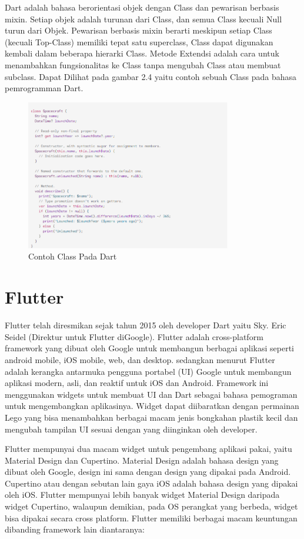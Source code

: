 \begin{enumerate}
	Dart adalah bahasa berorientasi objek dengan Class dan pewarisan berbasis mixin. Setiap objek adalah turunan dari Class, dan semua Class kecuali Null turun dari Objek. Pewarisan berbasis mixin berarti meskipun setiap Class (kecuali Top-Class) memiliki tepat satu superclass, Class dapat digunakan kembali dalam beberapa hierarki Class. Metode Extendsi adalah cara untuk menambahkan fungsionalitas ke Class tanpa mengubah Class atau membuat subclass. Dapat Dilihat pada gambar 2.4 yaitu contoh sebuah Class pada bahasa pemrogramman Dart.
	\begin{figure}[H]
		\centering
		\includegraphics[keepaspectratio, width=9cm]{gambar/Classes}
		\caption{Contoh Class Pada Dart}
		\label{gambar:Class}
	\end{figure}

\end{enumerate}


\section{Flutter}

Flutter telah diresmikan sejak tahun 2015 oleh developer Dart yaitu Sky. Eric Seidel (Direktur untuk Flutter diGoogle). Flutter adalah cross-platform framework yang dibuat oleh Google untuk membangun berbagai aplikasi seperti android mobile, iOS mobile, web, dan desktop. sedangkan menurut \citep{napoli2019} Flutter adalah kerangka antarmuka pengguna portabel (UI) Google untuk membangun aplikasi modern, asli, dan reaktif untuk iOS dan Android. Framework ini menggunakan widgets untuk membuat UI dan Dart sebagai bahasa pemograman untuk mengembangkan aplikasinya. Widget dapat diibaratkan dengan permainan Lego yang bisa menambahkan berbagai macam jenis bongkahan plastik kecil dan mengubah tampilan UI sesuai dengan yang diinginkan oleh developer.

Flutter mempunyai dua macam widget untuk pengembang aplikasi pakai, yaitu Material Design dan Cupertino. Material Design adalah bahasa design yang dibuat oleh Google, design ini sama dengan design yang dipakai pada Android. Cupertino atau dengan sebutan lain gaya iOS adalah bahasa design yang dipakai oleh iOS. Flutter mempunyai lebih banyak widget Material Design daripada widget Cupertino, walaupun demikian, pada OS perangkat yang berbeda, widget bisa dipakai secara cross platform. Flutter memiliki berbagai macam keuntungan dibanding framework lain diantaranya:


